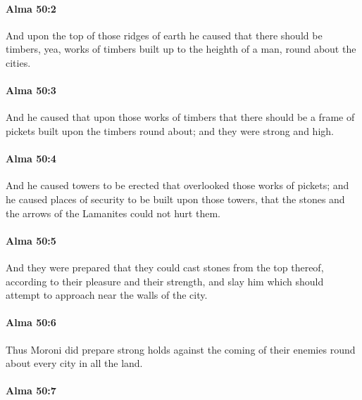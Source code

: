 		\paragraph{Alma 50:2} %
			\label{ALMA-50-2}

			And upon the top of those ridges of earth
			he caused that there should be timbers,
			yea, works of timbers built up to the heighth of a man,
			round about the cities.

		\paragraph{Alma 50:3} %
			\label{ALMA-50-3}

			And he caused that upon those works of timbers
			that there should be a frame of pickets built upon the timbers round about;
			and they were strong and high.

		\paragraph{Alma 50:4} %
			\label{ALMA-50-4}

			And he caused towers to be erected that overlooked those works of pickets;
			and he caused places of security to be built upon those towers,
			that the stones and the arrows of the Lamanites could not hurt them.

		\paragraph{Alma 50:5} %
			\label{ALMA-50-5}

			And they were prepared that they could cast stones from the top thereof,
			according to their pleasure and their strength,
			and slay him which should attempt to approach near the walls of the city.

		\paragraph{Alma 50:6} %
			\label{ALMA-50-6}

			Thus Moroni did prepare strong holds against the coming of their enemies
			round about every city in all the land.

		\paragraph{Alma 50:7} %
			\label{ALMA-50-7}

